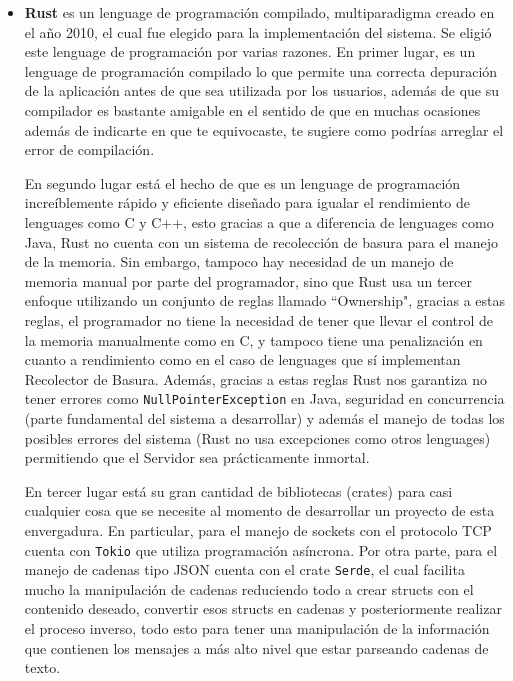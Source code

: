 \documentclass[12pt]{article}
\begin{document}
\begin{itemize}
\item \textbf{Rust} es un lenguage de programación compilado, multiparadigma creado en el año 2010, el cual fue elegido para la implementación del sistema. Se eligió este lenguage de programación por varias razones. En primer lugar, es un lenguage de programación compilado lo que permite una correcta depuración de la aplicación antes de que sea utilizada por los usuarios, además de que su compilador es bastante amigable en el sentido de que en muchas ocasiones además de indicarte en que te equivocaste, te sugiere como podrías arreglar el error de compilación.
  
  En segundo lugar está el hecho de que es un lenguage de programación increíblemente rápido y eficiente diseñado para igualar el rendimiento de lenguages como C y C++, esto gracias a que a diferencia de lenguages como Java, Rust no cuenta con un sistema de recolección de basura para el manejo de la memoria. Sin embargo, tampoco hay necesidad de un manejo de memoria manual por parte del programador, sino que Rust usa un tercer enfoque utilizando un conjunto de reglas llamado ``Ownership", gracias a estas reglas, el programador no tiene la necesidad de tener que llevar el control de la memoria manualmente como en C, y tampoco tiene una penalización en cuanto a  rendimiento como en el caso de lenguages que sí implementan Recolector de Basura. Además, gracias a estas reglas Rust nos garantiza no tener errores como \texttt{NullPointerException} en Java, seguridad en concurrencia (parte fundamental del sistema a desarrollar) y además el manejo de todas los posibles errores del sistema (Rust no usa excepciones como otros lenguages) permitiendo que el Servidor sea prácticamente inmortal.

  En tercer lugar está su gran cantidad de bibliotecas (crates) para casi cualquier cosa que se necesite al momento de desarrollar un proyecto de esta envergadura. En particular, para el manejo de sockets con el protocolo TCP cuenta con \texttt{Tokio} que utiliza programación asíncrona. Por otra parte, para el manejo de cadenas tipo JSON cuenta con el crate \texttt{Serde}, el cual facilita mucho la manipulación de cadenas reduciendo todo a crear structs con el contenido deseado, convertir esos structs en cadenas y posteriormente realizar el proceso inverso, todo esto para tener una manipulación de la información que contienen los mensajes a más alto nivel que estar parseando cadenas de texto.


\end{itemize}
\end{document}
